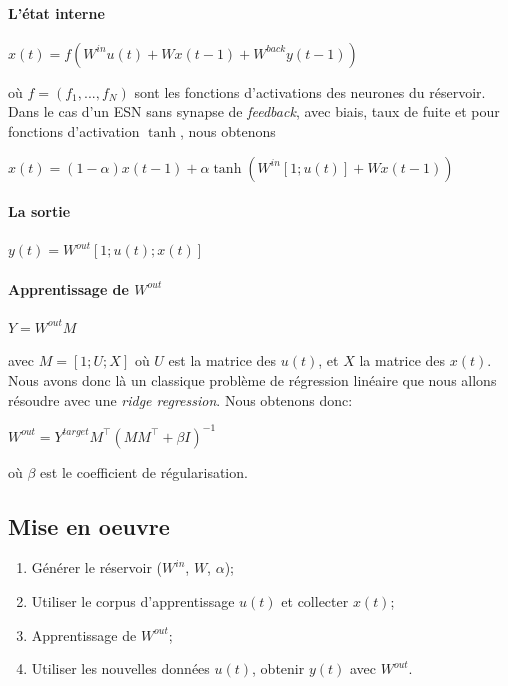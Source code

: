 \documentclass[12pt]{article}
\begin{document}
\paragraph{L'état interne}
\begin{center}
$x(t) = f(W^{in}u(t) + Wx(t-1) + W^{back}y(t-1) )$
\end{center}
où $f=(f_{1},...,f_{N})$ sont les fonctions d'activations des neurones du réservoir.\newline
Dans le cas d'un ESN sans synapse de \textit{feedback}, avec biais, taux de fuite et pour fonctions d'activation $\tanh$, nous obtenons
\begin{center}
$x(t) = (1-\alpha)x(t-1) + \alpha\tanh(W^{in}[1;u(t)] + Wx(t-1))$
\end{center}
\paragraph{La sortie}
\begin{center}
$y(t)= W^{out}[1;u(t);x(t)]$
\end{center}
\paragraph{Apprentissage de $W^{out}$}
\begin{center}
$Y = W^{out}M$
\end{center}
avec $M = [1; U; X]$ où $U$ est la matrice des $u(t)$, et $X$ la matrice des $x(t)$. Nous avons donc là un classique problème de régression linéaire que nous allons résoudre avec une \textit{ridge regression}. Nous obtenons donc:
\begin{center}
$W^{out} = Y^{target} M^\top (MM^\top + \beta I)^{-1}$
\end{center}
où $\beta$ est le coefficient de régularisation.

\subsection{Mise en oeuvre}
\begin{enumerate}
\item Générer le réservoir ($W^{in}$, $W$, $\alpha$);
\item Utiliser le corpus d'apprentissage $u(t)$ et collecter $x(t)$;
\item Apprentissage de $W^{out}$;
\item Utiliser les nouvelles données $u(t)$, obtenir  $y(t)$ avec $W^{out}$.
\end{enumerate}
\end{document}
